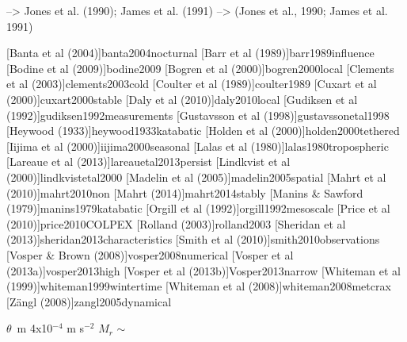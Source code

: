 
\citet{jon90,jam91} 	    -->    	Jones et al. (1990); James et al. (1991)
\citep{jon90,jam91} 	    -->    	(Jones et al., 1990; James et al. 1991)

[Banta et al (2004)]{banta2004nocturnal}
[Barr et al (1989)]{barr1989influence}
[Bodine et al (2009)]{bodine2009}
[Bogren et al (2000)]{bogren2000local}
[Clements et al (2003)]{clements2003cold}
[Coulter et al (1989)]{coulter1989}
[Cuxart et al (2000)]{cuxart2000stable}
[Daly et al (2010)]{daly2010local}
[Gudiksen et al (1992)]{gudiksen1992measurements}
[Gustavsson et al (1998)]{gustavssonetal1998}
[Heywood (1933)]{heywood1933katabatic}
[Holden et al (2000)]{holden2000tethered}
[Iijima et al (2000)]{iijima2000seasonal}
[Lalas et al (1980)]{lalas1980tropospheric}
[Lareaue et al (2013)]{lareauetal2013persist}
[Lindkvist et al (2000)]{lindkvistetal2000}
[Madelin et al (2005)]{madelin2005spatial}
[Mahrt et al (2010)]{mahrt2010non}
[Mahrt (2014)]{mahrt2014stably}
[Manins \& Sawford (1979)]{manins1979katabatic}
[Orgill et al (1992)]{orgill1992mesoscale}
[Price et al (2010)]{price2010COLPEX}
[Rolland (2003)]{rolland2003}
[Sheridan et al (2013)]{sheridan2013characteristics}
[Smith et al (2010)]{smith2010observations}
[Vosper \& Brown (2008)]{vosper2008numerical}
[Vosper et al (2013a)]{vosper2013high}
[Vosper et al (2013b)]{Vosper2013narrow}
[Whiteman et al (1999)]{whiteman1999wintertime}
[Whiteman et al (2008)]{whiteman2008metcrax}
[Z{\"a}ngl (2008)]{zangl2005dynamical}

$\theta$
$\,\mbox{m}$
4x10$^{-4}$ m s$^{-2}$
$M_r$
$\sim$
